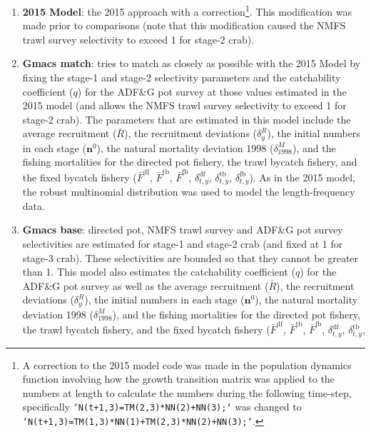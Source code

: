 \documentclass[]{article}
\let\rmarkdownfootnote\footnote%
\def\footnote{\protect\rmarkdownfootnote}
\begin{document}
\begin{enumerate}
\def\labelenumi{\arabic{enumi}.}
\item
  \textbf{2015 Model}: the 2015 approach with a correction\footnote{A
    correction to the 2015 model code was made in the population
    dynamics function involving how the growth transition matrix was
    applied to the numbers at length to calculate the numbers during the
    following time-step, specifically
    \texttt{`N(t+1,3)=TM(2,3)*NN(2)+NN(3);`} was changed to
    \texttt{`N(t+1,3)=TM(1,3)*NN(1)+TM(2,3)*NN(2)+NN(3);`}.}. This
  modification was made prior to comparisons (note that this
  modification caused the NMFS trawl survey selectivity to exceed 1 for
  stage-2 crab).
\item
  \textbf{Gmacs match}: tries to match as closely as possible with the
  2015 Model by fixing the stage-1 and stage-2 selectivity parameters
  and the catchability coefficient (\(q\)) for the ADF\&G pot survey at
  those values estimated in the 2015 model (and allows the NMFS trawl
  survey selectivity to exceed 1 for stage-2 crab). The parameters that
  are estimated in this model include the average recruitment
  (\(\bar{R}\)), the recruitment deviations (\(\delta^R_y\)), the
  initial numbers in each stage (\(\boldsymbol{n}^0\)), the natural
  mortality deviation 1998 (\(\delta^M_{1998}\)), and the fishing
  mortalities for the directed pot fishery, the trawl bycatch fishery,
  and the fixed bycatch fishery (\(\bar{F}^\text{df}\),
  \(\bar{F}^\text{tb}\), \(\bar{F}^\text{fb}\),
  \(\delta^\text{df}_{t,y}\), \(\delta^\text{tb}_{t,y}\),
  \(\delta^\text{fb}_{t,y}\)). As in the 2015 model, the robust
  multinomial distribution was used to model the length-frequency data.
\item
  \textbf{Gmacs base}: directed pot, NMFS trawl survey and ADF\&G pot
  survey selectivities are estimated for stage-1 and stage-2 crab (and
  fixed at 1 for stage-3 crab). These selectivities are bounded so that
  they cannot be greater than 1. This model also estimates the
  catchability coefficient (\(q\)) for the ADF\&G pot survey as well as
  the average recruitment (\(\bar{R}\)), the recruitment deviations
  (\(\delta^R_y\)), the initial numbers in each stage
  (\(\boldsymbol{n}^0\)), the natural mortality deviation 1998
  (\(\delta^M_{1998}\)), and the fishing mortalities for the directed
  pot fishery, the trawl bycatch fishery, and the fixed bycatch fishery
  (\(\bar{F}^\text{df}\), \(\bar{F}^\text{tb}\), \(\bar{F}^\text{fb}\),
  \(\delta^\text{df}_{t,y}\), \(\delta^\text{tb}_{t,y}\),

\end{enumerate}
\end{document}
